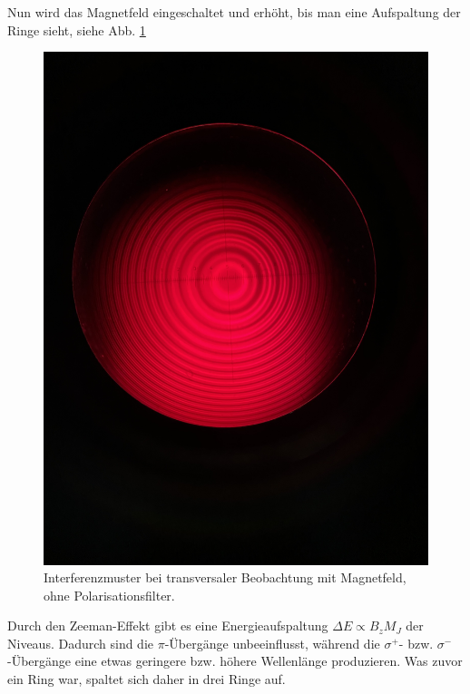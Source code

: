 \documentclass{article}
\begin{document}
\begin{multicols}{2}
Nun wird das Magnetfeld eingeschaltet und erhöht, bis man eine Aufspaltung der Ringe sieht, siehe Abb. \ref{fig:zeeman-transveral-mit-ohne}
\begin{figure}[H]
  \centering
  \includegraphics[width=.8\linewidth]{zeeman-transversal-mit-ohne}
  \caption{Interferenzmuster bei transversaler Beobachtung mit Magnetfeld, ohne Polarisationsfilter.}
  \label{fig:zeeman-transveral-mit-ohne}
\end{figure}
Durch den Zeeman-Effekt gibt es eine Energieaufspaltung $\Delta E \propto B_zM_J$ der Niveaus.
Dadurch sind die $\pi$-Übergänge unbeeinflusst, während die $\sigma^+$- bzw. $\sigma^-$-Übergänge
eine etwas geringere bzw. höhere Wellenlänge produzieren. Was zuvor ein Ring war, spaltet sich daher in drei Ringe auf.


\end{multicols}
\end{document}

